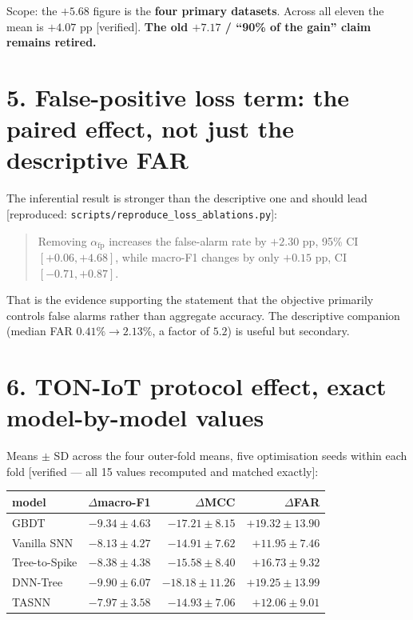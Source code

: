 \noindent Scope: the $+5.68$ figure is the \textbf{four primary datasets}. Across all
eleven the mean is $+4.07$ pp \textup{[verified]}. \textbf{The old $+7.17$ / ``90\% of the
gain'' claim remains retired.}

\section*{5. False-positive loss term: the paired effect, not just the descriptive FAR}

The inferential result is stronger than the descriptive one and should lead
\textup{[reproduced: \texttt{scripts/reproduce\_loss\_ablations.py}]}:

\begin{quote}
Removing $\alpha_{\mathrm{fp}}$ increases the false-alarm rate by $\mathbf{+2.30}$ pp,
95\% CI $[+0.06, +4.68]$, while macro-F1 changes by only $+0.15$ pp,
CI $[-0.71, +0.87]$.
\end{quote}

\noindent That is the evidence supporting the statement that the objective primarily
controls false alarms rather than aggregate accuracy. The descriptive companion (median
FAR $0.41\% \rightarrow 2.13\%$, a factor of $5.2$) is useful but secondary.

\section*{6. TON-IoT protocol effect, exact model-by-model values}

Means $\pm$ SD across the four outer-fold means, five optimisation seeds within each fold
\textup{[verified --- all 15 values recomputed and matched exactly]}:

\begin{center}\small
\begin{tabular}{lrrr}\toprule
model & $\Delta$macro-F1 & $\Delta$MCC & $\Delta$FAR \\\midrule
GBDT           & $-9.34 \pm 4.63$ & $-17.21 \pm 8.15$  & $+19.32 \pm 13.90$ \\
Vanilla SNN    & $-8.13 \pm 4.27$ & $-14.91 \pm 7.62$  & $+11.95 \pm 7.46$ \\
Tree-to-Spike  & $-8.38 \pm 4.38$ & $-15.58 \pm 8.40$  & $+16.73 \pm 9.32$ \\
DNN-Tree       & $-9.90 \pm 6.07$ & $-18.18 \pm 11.26$ & $+19.25 \pm 13.99$ \\
TASNN          & $-7.97 \pm 3.58$ & $-14.93 \pm 7.06$  & $+12.06 \pm 9.01$ \\
\bottomrule\end{tabular}\end{center}


